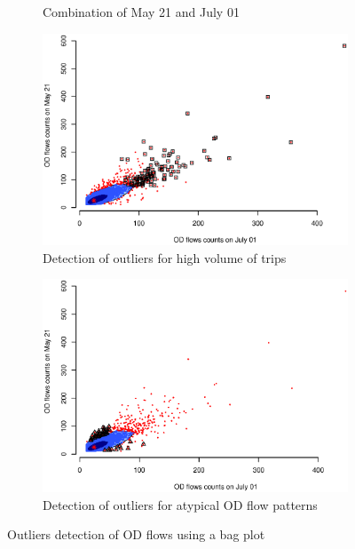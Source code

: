 \documentclass[a4paper,UKenglish]{lipics-v2016}
\begin{document}
\begin{figure}
\begin{subfigure}[b]{0.49\textwidth}
	\caption{Combination of May 21 and July 01}
	\label{fig:OD_0721_0521}
	\end{subfigure}
    \hfill
	\begin{subfigure}[b]{0.49\textwidth}
	\includegraphics[width=\textwidth]{images/Outliers_high_0701_0521.eps}
	\caption{Detection of outliers for high volume of trips}
	\label{fig:OD_outliers_high}
    \end{subfigure}
	\begin{subfigure}[b]{0.53\textwidth}
	\includegraphics[width=\textwidth]{images/Outliers_rare_0701_0521.eps}
	\caption{Detection of outliers for atypical OD flow patterns}
	\label{fig:OD_outliers_rare}
    \end{subfigure}
	\caption{Outliers detection of OD flows using a bag plot}\label{fig:bagplot_0521_0701}	
\end{figure}
\end{document}
